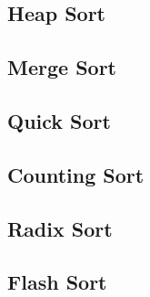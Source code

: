 \documentclass[11pt,a4paper]{article}
\begin{document}
\subsection{Heap Sort}
\subsection{Merge Sort}
\subsection{Quick Sort}
\subsection{Counting Sort}
\subsection{Radix Sort}
\subsection{Flash Sort}
\end{document}
